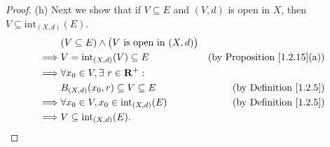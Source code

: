 \begin{proof}{(h)}
    Next we show that if \(V \subseteq E\) and \((V, d)\) is open in \(X\), then \(V \subseteq \text{int}_{(X, d)}(E)\).
    \begin{align*}
                 & (V \subseteq E) \land \big(V \text{ is open in } (X, d)\big)                                           \\
        \implies & V = \text{int}_{(X, d)}(V) \subseteq E                       & \text{(by Proposition \ref{1.2.15}(a))} \\
        \implies & \forall x_0 \in V, \exists\ r \in \mathbf{R}^+ :                                                       \\
                 & B_{(X, d)}(x_0, r) \subseteq V \subseteq E                   & \text{(by Definition \ref{1.2.5})}      \\
        \implies & \forall x_0 \in V, x_0 \in \text{int}_{(X, d)}(E)            & \text{(by Definition \ref{1.2.5})}      \\
        \implies & V \subseteq \text{int}_{(X, d)}(E).
    \end{align*}


\end{proof}
